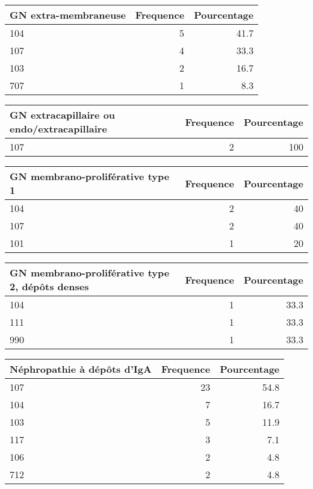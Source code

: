 \documentclass[11pt,a4paper]{article}\usepackage[]{graphicx}\usepackage[]{color}
\begin{document}
\begin{table}[H]
\centering
\begin{tabular}{lrr}
  \hline
GN extra-membraneuse & Frequence & Pourcentage \\ 
  \hline
104 & 5 & 41.7 \\ 
  107 & 4 & 33.3 \\ 
  103 & 2 & 16.7 \\ 
  707 & 1 & 8.3 \\ 
   \hline
\end{tabular}
\end{table}
\begin{table}[H]
\centering
\begin{tabular}{lrr}
  \hline
GN extracapillaire ou endo/extracapillaire & Frequence & Pourcentage \\ 
  \hline
107 & 2 & 100 \\ 
   \hline
\end{tabular}
\end{table}
\begin{table}[H]
\centering
\begin{tabular}{lrr}
  \hline
GN membrano-proliférative type 1 & Frequence & Pourcentage \\ 
  \hline
104 & 2 & 40 \\ 
  107 & 2 & 40 \\ 
  101 & 1 & 20 \\ 
   \hline
\end{tabular}
\end{table}
\begin{table}[H]
\centering
\begin{tabular}{lrr}
  \hline
GN membrano-proliférative type 2, dépôts denses & Frequence & Pourcentage \\ 
  \hline
104 & 1 & 33.3 \\ 
  111 & 1 & 33.3 \\ 
  990 & 1 & 33.3 \\ 
   \hline
\end{tabular}
\end{table}
\begin{table}[H]
\centering
\begin{tabular}{lrr}
  \hline
Néphropathie à dépôts d'IgA & Frequence & Pourcentage \\ 
  \hline
107 & 23 & 54.8 \\ 
  104 & 7 & 16.7 \\ 
  103 & 5 & 11.9 \\ 
  117 & 3 & 7.1 \\ 
  106 & 2 & 4.8 \\ 
  712 & 2 & 4.8 \\ 
   \hline
\end{tabular}
\end{table}
\end{document}
